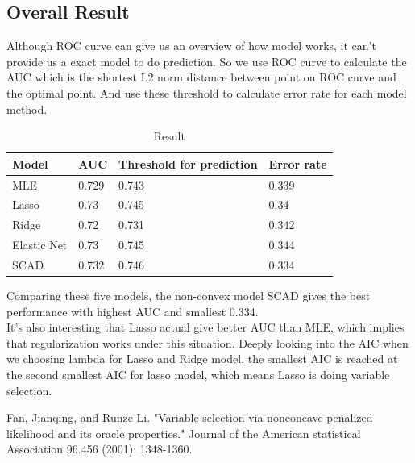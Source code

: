 \documentclass[paper=a4, fontsize=11pt]{scrartcl} %
\numberwithin{equation}{section} %
\numberwithin{figure}{section} %
\numberwithin{table}{section} %
\begin{document}
\subsection{Overall Result}
Although ROC curve can give us an overview of how model works, it can't provide us a exact model to do prediction. So we use ROC curve to calculate the AUC which is the shortest L2 norm distance between point on ROC curve and the optimal point. And use these threshold to calculate error rate for each model method.
\begin{table}[!ht]
\centering
\caption{Result}
\label{fig:1}
\begin{tabular}{llll}
\hline
Model       & AUC   & Threshold for prediction & Error rate \\\hline
MLE         & 0.729 & 0.743                    & 0.339      \\
Lasso       & 0.73  & 0.745                    & 0.34       \\
Ridge       & 0.72  & 0.731                    & 0.342      \\
Elastic Net & 0.73  & 0.745                    & 0.344      \\
SCAD        & 0.732 & 0.746                    & 0.334     \\\hline
\end{tabular}
\end{table}
Comparing these five models, the non-convex model SCAD gives the best performance with highest AUC and smallest 0.334.   \\
It's also interesting that Lasso actual give better AUC than MLE, which implies that regularization works under this situation. 
Deeply looking into the AIC when we choosing  lambda for Lasso and Ridge model, the smallest AIC is reached at the second smallest AIC for lasso model, which means Lasso is doing variable selection.


\begin{thebibliography}{00}
Fan, Jianqing, and Runze Li. "Variable selection via nonconcave penalized likelihood and its oracle properties." Journal of the American statistical Association 96.456 (2001): 1348-1360.

\end{thebibliography}
\end{document}
